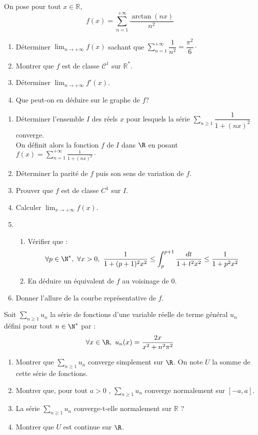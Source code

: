 \documentclass[a4paper,twoside,french,11pt]{VcCours}
\newcommand{\Sum}[2]{\sum_{#1}^{#2}}
\begin{document}
\newpage
\begin{Exercice}{} On pose pour tout $x \in \mathbb{R}$,
$$ f(x) = \sum_{n=1}^{+ \infty} \dfrac{\arctan(nx)}{n^2}$$
\begin{enumerate}
\item Déterminer $\lim_{n \rightarrow + \infty} f(x)$ sachant que $\sum_{n=1}^{+ \infty} \dfrac{1}{n^2} = \dfrac{\pi^2}{6} \cdot$
\item Montrer que $f$ est de classe $\mathcal{C}^1$ sur $\mathbb{R}^*$.
\item Déterminer $\lim_{n \rightarrow + \infty} f'(x)$.
\item Que peut-on en déduire sur le graphe de $f$?
\end{enumerate}
\end{Exercice}



\begin{Exercice}{} \begin{enumerate}
\item Déterminer l'ensemble $I$ des réels $x$ pour lesquels la série $\Sum{n\geq 1}{} \dfrac{1}{1+(nx)^2}$ converge.\\
On définit alors la fonction $f$ de $I$ dans $\R$ en posant $f(x)=\sum_{n=1}^{+\infty}\frac{1}{1+(nx)^2}\cdot$
\item Déterminer la parité de $f$ puis son sens de variation de $f$. 
\item Prouver que $f$ est de classe $C^1$ sur $I$.
\item Calculer $\lim_{x\to +\infty}f(x)$.
\item
\begin{enumerate}
\item Vérifier que :
\[\forall p\in \N^*,\ \forall x >0,\ \frac{1}{1+(p+1)^2x^2}\leq \int_p^{p+1}\frac{dt}{1+t^2x^2}\leq \frac{1}{1+p^2x^2}\] 
\item En déduire un équivalent de $f$ au voisinage de $0$.
\end{enumerate}
\item Donner l'allure de la courbe représentative de $f$.
\end{enumerate}
\end{Exercice}


\begin{Exercice}{}  Soit $\Sum{n \geq 1}{} u_n$ la série de fonctions d'une variable réelle de terme général $u_n$ défini pour tout $n \in \N^*$ par : 
$$ \forall x \in \R ,\ u_n(x)=\dfrac{2x}{x^2+n^2\pi^2}$$
\begin{enumerate}
\item Montrer que $\Sum{n \geq 1}{} u_n$ converge simplement sur $\R$. On note $U$ la somme de cette  série de fonctions.
\item Montrer que, pour tout $a > 0$ , $\Sum{n \geq 1}{} u_n$ converge normalement sur $[-a,a]$.
\item La série $\Sum{n \geq 1}{} u_n$ converge-t-elle normalement sur $\mathbb{R}$ ?
\item Montrer que $U$ est continue sur $\R$.
\end{enumerate}
\end{Exercice}
\end{document}
